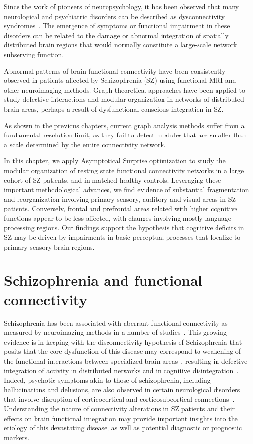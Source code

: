 Since the work of pioneers of neuropsychology, it has been observed that many neurological and psychiatric disorders can be described as dysconnectivity syndromes~\cite{catani2005}.
The emergence of symptoms or functional impairment in these disorders can be related to the damage or abnormal integration of spatially distributed brain regions that would normally constitute a large-scale network subserving function.

Abnormal patterns of brain functional connectivity have been consistently observed in patients affected by Schizophrenia (SZ) using functional MRI and other neuroimaging methods.
Graph theoretical approaches have been applied to study defective interactions and modular organization in networks of distributed brain areas, perhaps a result of dysfunctional conscious integration in SZ.

As shown in the previous chapters, current graph analysis methods suffer from a fundamental resolution limit, as they fail to detect modules that are smaller than a scale determined by the entire connectivity network.

In this chapter, we apply Asymptotical Surprise optimization to study the modular organization of resting state functional connectivity networks in a large cohort of SZ patients, and in matched healthy controls.
Leveraging these important methodological advances, we find evidence of substantial fragmentation and reorganization involving primary sensory, auditory and visual areas in SZ patients.
Conversely, frontal and prefrontal areas related with higher cognitive functions appear to be less affected, with changes involving mostly language-processing regions.
Our findings support the hypothesis that cognitive deficits in SZ may be driven by impairments in basic perceptual processes that localize to primary sensory brain regions.

\section{Schizophrenia and functional connectivity}
Schizophrenia has been associated with aberrant functional connectivity as measured by neuroimaging methods in a number of studies~\cite{friston1995,bullmore1998,liang2006,liu2008,calhoun2009,alexander-bloch2010,alexander-bloch2012,alexander-bloch2013a}.
This growing evidence is in keeping with the disconnectivity hypothesis of Schizophrenia that posits that the core dysfunction of this disease may correspond to weakening of the functional interactions between specialized brain areas~\cite{ellison-wright2009,fornito2009,kubicki2005}, resulting in defective integration of activity in distributed networks and in cognitive disintegration~\cite{tononi2000}.
Indeed, psychotic symptoms akin to those of schizophrenia, including hallucinations and delusions, are also observed in certain neurological disorders that involve disruption of corticocortical and corticosubcortical connections~\cite{hyde1992}.
Understanding the nature of connectivity alterations in SZ patients and their effects on brain functional integration may provide important insights into the etiology of this devastating disease, as well as potential diagnostic or prognostic markers.

